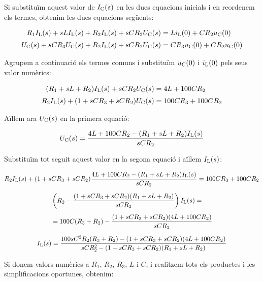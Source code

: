 \begin{exemple}
    Si substituïm aquest valor de $I_\mathrm{C}(s)$ en les dues equacions
    inicials i en reordenem els termes, obtenim les dues equacions següents:

    \begin{align*}
        R_1 I_\mathrm{L}(s) + s L I_\mathrm{L}(s)  + R_2
        I_\mathrm{L}(s) + s C R_2 U_\mathrm{C}(s) &= L i_\mathrm{L}(0) + C R_2 u_\mathrm{C}(0)\\[0.5ex]
        U_\mathrm{C}(s) + s C R_3 U_\mathrm{C}(s) + R_2 I_\mathrm{L}(s) + s C R_2 U_\mathrm{C}(s)
        &= C R_3 u_\mathrm{C}(0) + C R_2 u_\mathrm{C}(0)
    \end{align*}

    Agrupem a continuació els termes comuns i substituïm $u_\mathrm{C}(0)$ i
    $i_\mathrm{L}(0)$ pels seus valor numèrics:

    \begin{align*}
        (R_1 + s L + R_2) I_\mathrm{L}(s) + s C R_2 U_\mathrm{C}(s) &= 4 L  + 100 C R_2\\[0.5ex]
        R_2 I_\mathrm{L}(s) + (1 +s C R_3 + s C R_2) U_\mathrm{C}(s) &= 100 C R_3  + 100 C R_2
    \end{align*}

    Aïllem ara $U_\mathrm{C}(s)$ en la primera equació:

    \[
        U_\mathrm{C}(s) = \frac{4 L  + 100 C R_2 -(R_1 + s L + R_2) I_\mathrm{L}(s)}{s C R_2}
    \]

    Substituïm tot seguit aquest valor en la segona equació i aïllem
    $I_\mathrm{L}(s)$:

    \begin{gather*}
       R_2 I_\mathrm{L}(s) + (1 + s C R_3 + s C R_2) \frac{4 L  + 100 C R_2 - (R_1 + s L + R_2)I_\mathrm{L}(s)}{s C R_2} = 100 C R_3  + 100 C R_2 \\[1.5ex]
       \begin{split} &\left( R_2 - \frac{(1 +s C R_3 + s C R_2)(R_1 + s L + R_2)}{s C R_2} \right) I_\mathrm{L}(s)
       = \\[1ex] &= 100 C (R_3  + R_2) - \frac{(1 +s C R_3 + s C R_2)(4 L  + 100 C R_2)}{s C
       R_2}\end{split}\\[1.5ex]
    I_\mathrm{L}(s) = \frac{100 s C^2 R_2(R_3  + R_2)- (1 +s C R_3 + s C
    R_2)(4 L  + 100 C R_2)}{s C R_2^2  -(1 +s C R_3 + s C R_2)(R_1 + s L
    + R_2)}
    \end{gather*}

    Si donem valors numèrics a $R_1$, $R_2$, $R_3$, $L$ i $C$, i
    realitzem tots els productes i les  simplificacions oportunes,
    obtenim:


\end{exemple}
